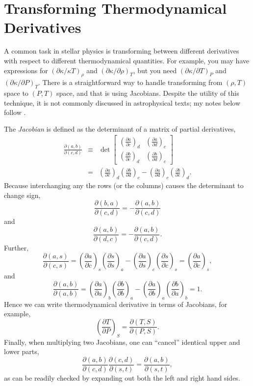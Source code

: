 \chapter[Thermodynamical Derivatives]{Transforming Thermodynamical Derivatives}
\newcommand{\jac}[4]{\ensuremath{\frac{\partial(#1,#2)}{\partial(#3,#4)}}}
\newcommand{\DD}[3]{\ensuremath{\left(\frac{\partial #1}{\partial #2}\right)_{#3}}}

A common task in stellar physics is transforming between different derivatives with respect to different thermodynamical quantities.  For example, you may have expressions for $(\partial \kappa/\kappa T)_{\rho}$ and $(\partial \kappa/\partial \rho)_{T}$, but you need $(\partial\kappa/\partial T)_{P}$ and $(\partial\kappa/\partial P)_{T}$.  There is a straightforward way to handle transforming from $(\rho,T)$ space to $(P,T)$ space, and that is using Jacobians.  Despite the utility of this technique, it is not commonly discussed in astrophysical texts; my notes below follow \citet{landau80:_statis_physic}.

The \emph{Jacobian} is defined as the determinant of a matrix of partial derivatives,
\begin{eqnarray}
\jac{a}{b}{c}{d} &\equiv& \det\left[
	\begin{array}{lr}\DD{a}{c}{d} & \DD{a}{d}{c}\\
	\DD{b}{c}{d} & \DD{b}{d}{c} \end{array}\right] \nonumber \\
 & = & \DD{a}{c}{d}\DD{b}{d}{c} - \DD{a}{d}{c}\DD{b}{c}{d}.
 \end{eqnarray}
Because interchanging any the rows (or the columns) causes the determinant to change sign, 
\begin{equation}
\jac{b}{a}{c}{d} = -\jac{a}{b}{c}{d}
\end{equation}
and
\begin{equation}
\jac{a}{b}{d}{c} = -\jac{a}{b}{c}{d}.
\end{equation}
Further,
\begin{equation}
\jac{a}{s}{c}{s} = \DD{a}{c}{s}\DD{s}{s}{a} - \DD{a}{s}{c}\DD{s}{c}{s} = \DD{a}{c}{s},
\end{equation}
and
\begin{equation}
\jac{a}{b}{a}{b} = \DD{a}{a}{b}\DD{b}{b}{a} - \DD{a}{b}{a}\DD{b}{a}{b} = 1.
\end{equation}
Hence we can write thermodynamical derivative in terms of Jacobians, for example,
\begin{equation}
\DD{T}{P}{S} = \jac{T}{S}{P}{S}.
\end{equation}
Finally, when multiplying two Jacobians, one can ``cancel'' identical upper and lower parts,
\begin{equation}
\jac{a}{b}{c}{d}\jac{c}{d}{s}{t} =\jac{a}{b}{s}{t},
\end{equation}
as can be readily checked by expanding out both the left and right hand sides.

